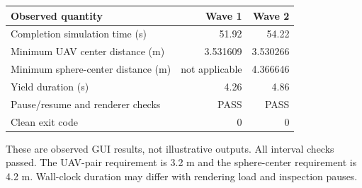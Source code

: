 \begin{center}\small\begin{tabular}{lrr}\toprule
Observed quantity & Wave 1 & Wave 2\\\midrule
Completion simulation time (s) & 51.92 & 54.22\\
Minimum UAV center distance (m) & 3.531609 & 3.530266\\
Minimum sphere-center distance (m) & not applicable & 4.366646\\
Yield duration (s) & 4.26 & 4.86\\
Pause/resume and renderer checks & PASS & PASS\\
Clean exit code & 0 & 0\\\bottomrule\end{tabular}\end{center}
These are observed GUI results, not illustrative outputs. All interval checks passed. The UAV-pair requirement is 3.2 m and the sphere-center requirement is 4.2 m. Wall-clock duration may differ with rendering load and inspection pauses.
